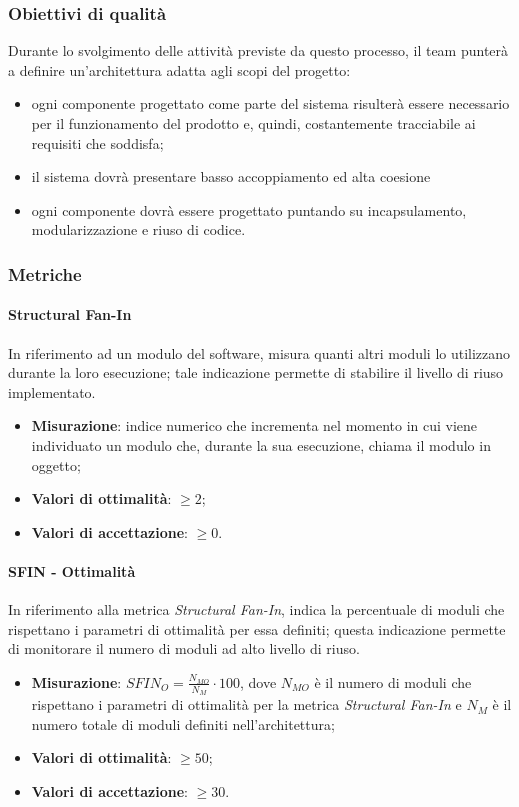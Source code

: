 \subsubsection{Obiettivi di qualità}
Durante lo svolgimento delle attività previste da questo processo, il team punterà a definire un'architettura adatta agli scopi del progetto:
\begin{itemize}
\item ogni componente progettato come parte del sistema risulterà essere necessario per il funzionamento del prodotto e, quindi, costantemente tracciabile ai requisiti che soddisfa;
\item il sistema dovrà presentare basso accoppiamento ed alta coesione
\item ogni componente dovrà essere progettato puntando su incapsulamento, modularizzazione e riuso di codice.
\end{itemize}
\subsubsection{Metriche}
\paragraph{Structural Fan-In}
In riferimento ad un modulo del software, misura quanti altri moduli lo utilizzano durante la loro esecuzione; tale indicazione permette di stabilire il livello di riuso implementato.
\begin{itemize}
\item \textbf{Misurazione}: indice numerico che incrementa nel momento in cui viene individuato un modulo che, durante la sua esecuzione, chiama il modulo in oggetto;
\item \textbf{Valori di ottimalità}: $\geq 2$;
\item \textbf{Valori di accettazione}: $\geq 0$.
\end{itemize}
\paragraph{SFIN - Ottimalità}
\label{sfin-ottimalita}
In riferimento alla metrica \textit{Structural Fan-In}, indica la percentuale di moduli che rispettano i parametri di ottimalità per essa definiti; questa indicazione permette di monitorare il numero di moduli ad alto livello di riuso.
\begin{itemize}
\item \textbf{Misurazione}: $SFIN_{O}=\frac{N_{MO}}{N_{M}} \cdot 100$, dove $N_{MO}$ è il numero di moduli che rispettano i parametri di ottimalità per la metrica \textit{Structural Fan-In} e $N_{M}$ è il numero totale di moduli definiti nell'architettura;
\item \textbf{Valori di ottimalità}: $\geq 50$;
\item \textbf{Valori di accettazione}: $\geq 30$.
\end{itemize}
